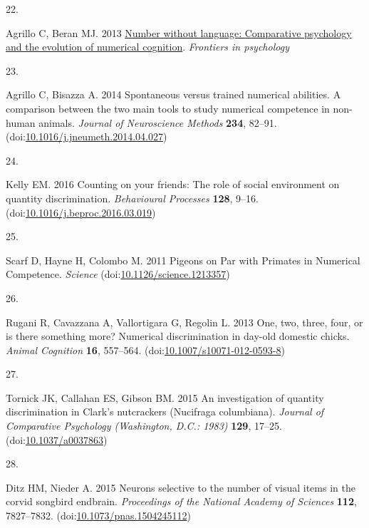 \documentclass[
  ,doc,floatsintext]{apa6}
\newlength{\cslhangindent}
\newlength{\csllabelwidth}
\newlength{\cslentryspacingunit} %
\newenvironment{CSLReferences}[2] %
 {%
  \setlength{\parindent}{0pt}
  \ifodd #1
  \let\oldpar\par
  \def\par{\hangindent=\cslhangindent\oldpar}
  \fi
  \setlength{\parskip}{#2\cslentryspacingunit}
 }%
 {}
\newcommand{\CSLLeftMargin}[1]{\parbox[t]{\csllabelwidth}{#1}}
\newcommand{\CSLRightInline}[1]{\parbox[t]{\linewidth - \csllabelwidth}{#1}\break}
\begin{document}
\begin{CSLReferences}{0}{0}
\leavevmode{}%
\CSLLeftMargin{22. }%
\CSLRightInline{Agrillo C, Beran MJ. 2013 \href{https://www.academia.edu/6879466/Number_without_language_comparative_psychology_and_the_evolution_of_numerical_cognition}{Number without language: Comparative psychology and the evolution of numerical cognition}. \emph{Frontiers in psychology} }

\leavevmode{}%
\CSLLeftMargin{23. }%
\CSLRightInline{Agrillo C, Bisazza A. 2014 Spontaneous versus trained numerical abilities. {A} comparison between the two main tools to study numerical competence in non-human animals. \emph{Journal of Neuroscience Methods} \textbf{234}, 82--91. (doi:\href{https://doi.org/10.1016/j.jneumeth.2014.04.027}{10.1016/j.jneumeth.2014.04.027})}

\leavevmode{}%
\CSLLeftMargin{24. }%
\CSLRightInline{Kelly EM. 2016 Counting on your friends: {The} role of social environment on quantity discrimination. \emph{Behavioural Processes} \textbf{128}, 9--16. (doi:\href{https://doi.org/10.1016/j.beproc.2016.03.019}{10.1016/j.beproc.2016.03.019})}

\leavevmode{}%
\CSLLeftMargin{25. }%
\CSLRightInline{Scarf D, Hayne H, Colombo M. 2011 Pigeons on {Par} with {Primates} in {Numerical} {Competence}. \emph{Science} (doi:\href{https://doi.org/10.1126/science.1213357}{10.1126/science.1213357})}

\leavevmode{}%
\CSLLeftMargin{26. }%
\CSLRightInline{Rugani R, Cavazzana A, Vallortigara G, Regolin L. 2013 One, two, three, four, or is there something more? {Numerical} discrimination in day-old domestic chicks. \emph{Animal Cognition} \textbf{16}, 557--564. (doi:\href{https://doi.org/10.1007/s10071-012-0593-8}{10.1007/s10071-012-0593-8})}

\leavevmode{}%
\CSLLeftMargin{27. }%
\CSLRightInline{Tornick JK, Callahan ES, Gibson BM. 2015 An investigation of quantity discrimination in {Clark}'s nutcrackers ({Nucifraga} columbiana). \emph{Journal of Comparative Psychology (Washington, D.C.: 1983)} \textbf{129}, 17--25. (doi:\href{https://doi.org/10.1037/a0037863}{10.1037/a0037863})}

\leavevmode{}%
\CSLLeftMargin{28. }%
\CSLRightInline{Ditz HM, Nieder A. 2015 Neurons selective to the number of visual items in the corvid songbird endbrain. \emph{Proceedings of the National Academy of Sciences} \textbf{112}, 7827--7832. (doi:\href{https://doi.org/10.1073/pnas.1504245112}{10.1073/pnas.1504245112})}


\end{CSLReferences}
\end{document}
